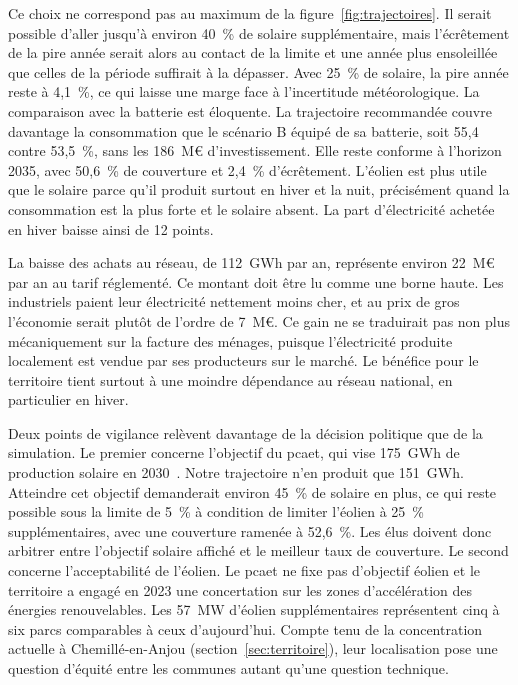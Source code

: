 Ce choix ne correspond pas au maximum de la figure~\ref{fig:trajectoires}. Il serait possible d'aller jusqu'à environ 40~\% de solaire supplémentaire, mais l'écrêtement de la pire année serait alors au contact de la limite et une année plus ensoleillée que celles de la période suffirait à la dépasser. Avec 25~\% de solaire, la pire année reste à 4,1~\%, ce qui laisse une marge face à l'incertitude météorologique. La comparaison avec la batterie est éloquente. La trajectoire recommandée couvre davantage la consommation que le scénario B équipé de sa batterie, soit 55,4 contre 53,5~\%, sans les 186~M€ d'investissement. Elle reste conforme à l'horizon 2035, avec 50,6~\% de couverture et 2,4~\% d'écrêtement. L'éolien est plus utile que le solaire parce qu'il produit surtout en hiver et la nuit, précisément quand la consommation est la plus forte et le solaire absent. La part d'électricité achetée en hiver baisse ainsi de 12 points.

La baisse des achats au réseau, de 112~GWh par an, représente environ 22~M€ par an au tarif réglementé. Ce montant doit être lu comme une borne haute. Les industriels paient leur électricité nettement moins cher, et au prix de gros l'économie serait plutôt de l'ordre de 7~M€. Ce gain ne se traduirait pas non plus mécaniquement sur la facture des ménages, puisque l'électricité produite localement est vendue par ses producteurs sur le marché. Le bénéfice pour le territoire tient surtout à une moindre dépendance au réseau national, en particulier en hiver.

Deux points de vigilance relèvent davantage de la décision politique que de la simulation. Le premier concerne l'objectif du \gls{pcaet}, qui vise 175~GWh de production solaire en 2030~\cite{pcaet}. Notre trajectoire n'en produit que 151~GWh. Atteindre cet objectif demanderait environ 45~\% de solaire en plus, ce qui reste possible sous la limite de 5~\% à condition de limiter l'éolien à 25~\% supplémentaires, avec une couverture ramenée à 52,6~\%. Les élus doivent donc arbitrer entre l'objectif solaire affiché et le meilleur taux de couverture. Le second concerne l'acceptabilité de l'éolien. Le \gls{pcaet} ne fixe pas d'objectif éolien et le territoire a engagé en 2023 une concertation sur les zones d'accélération des énergies renouvelables. Les 57~MW d'éolien supplémentaires représentent cinq à six parcs comparables à ceux d'aujourd'hui. Compte tenu de la concentration actuelle à Chemillé-en-Anjou (section~\ref{sec:territoire}), leur localisation pose une question d'équité entre les communes autant qu'une question technique.


